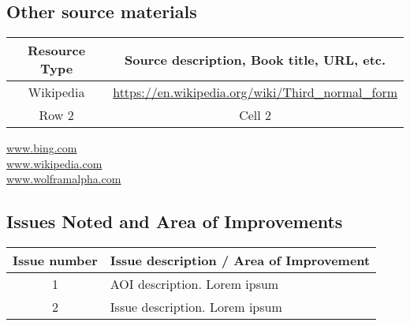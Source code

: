 \subsection{Other source materials} \label{subsec:source}


\begin{tabular}{c|c}
    Resource Type & Source description, Book title, URL, etc.\\
    \hline
    Wikipedia & \url{https://en.wikipedia.org/wiki/Third_normal_form}\\ \hline
    Row 2 & Cell 2\\ \hline
\end{tabular}



\url{www.bing.com}\\
\url{www.wikipedia.com}\\
\url{www.wolframalpha.com}\\

\subsection{Issues Noted and Area of Improvements}

\begin{tabular}{c|l}
    Issue number & Issue description / Area of Improvement\\
    \hline
    1 & AOI description. Lorem ipsum\\ \hline
    2 & Issue description. Lorem ipsum\\
    
\end{tabular}